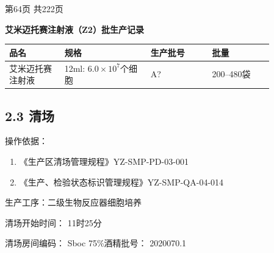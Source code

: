 \documentclass[UTF8,10pt,a4paper,fontset=fandol]{ctexart}
\newcommand{\fieldvalue}[1]{#1}
\newcommand{\handwritten}[1]{#1}
\begin{document}
\vfill
\begin{center}
第64页 共222页
\end{center}

\newpage

\begin{center}
\textbf{艾米迈托赛注射液（Z2）批生产记录}
\end{center}

\begin{tabular}{|p{0.18\linewidth}|p{0.28\linewidth}|p{0.20\linewidth}|p{0.20\linewidth}|}
\hline
品名 & 规格 & 生产批号 & 批量 \\
\hline
艾米迈托赛注射液 &
12ml: $6.0\times10^{7}$个细胞 &
\fieldvalue{\handwritten{A?}} &
200--480袋 \\
\hline
\end{tabular}

\subsection*{2.3 清场}

操作依据：

\begin{enumerate}
\item 《生产区清场管理规程》\hfill YZ-SMP-PD-03-001
\item 《生产、检验状态标识管理规程》\hfill YZ-SMP-QA-04-014
\end{enumerate}

生产工序：二级生物反应器细胞培养

清场开始时间：
\fieldvalue{\handwritten{11时25分}}

清场房间编码：
\fieldvalue{\handwritten{Sboc}}
\hfill
75\%酒精批号：
\fieldvalue{\handwritten{2020070.1}}
\end{document}
